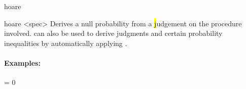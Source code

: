 \begin{tactic}{hoare}

  \begin{tsyntax}{hoare <spec>}
  Derives a null probability from a \hl judgement on the procedure
  involved.  can also be used to derive \phl judgments and
  certain probability inequalities by automatically applying
  .

  \paragraph{Examples:}\strut

  \begin{cmathpar}
    \texample
      {}
      {}
      { = 0}

    \texample
      {}
      {}
      {}
  \end{cmathpar}
  \end{tsyntax}
\end{tactic}
